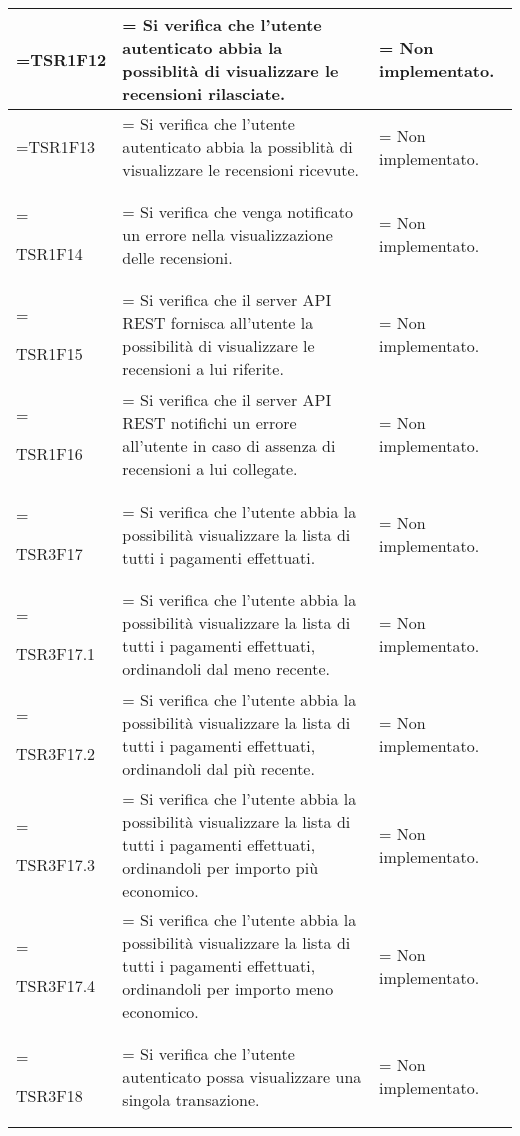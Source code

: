 \begin{xltabular}{\textwidth} {
        >{\hsize\linewidth=\hsize}X
        >{\hsize\linewidth=\hsize}X
        >{\hsize\linewidth=\hsize}X
    }
    TSR1F12 &
    Si verifica che l'utente autenticato abbia la possiblità di visualizzare le recensioni rilasciate.  &
    Non implementato.
    \\ \hline

    TSR1F13 &
    Si verifica che l'utente autenticato abbia la possiblità di visualizzare le recensioni ricevute.  &
    Non implementato.
    \\ \hline

    TSR1F14 &
    Si verifica che venga notificato un errore nella visualizzazione delle recensioni.  &
    Non implementato.
    \\ \hline

    TSR1F15 &
    Si verifica che il server API REST fornisca all'utente la possibilità di visualizzare le recensioni a lui riferite. &
    Non implementato.
    \\ \hline

    TSR1F16 &
    Si verifica che il server API REST notifichi un errore all'utente in caso di assenza di recensioni a lui collegate. &
    Non implementato.
    \\ \hline


    TSR3F17 &
    Si verifica che l'utente abbia la possibilità visualizzare la lista di tutti i pagamenti
    effettuati. &
    Non implementato.
    \\ \hline

    TSR3F17.1 &
    Si verifica che l'utente abbia la possibilità visualizzare la lista di tutti i pagamenti
    effettuati, ordinandoli dal meno recente. &
    Non implementato.
    \\ \hline

    TSR3F17.2 &
    Si verifica che l'utente abbia la possibilità visualizzare la lista di tutti i pagamenti
    effettuati, ordinandoli dal più recente. &
    Non implementato.
    \\ \hline

    TSR3F17.3 &
    Si verifica che l'utente abbia la possibilità visualizzare la lista di tutti i pagamenti
    effettuati, ordinandoli per importo più economico. &
    Non implementato.
    \\ \hline
    
    TSR3F17.4 &
    Si verifica che l'utente abbia la possibilità visualizzare la lista di tutti i pagamenti
    effettuati, ordinandoli per importo meno economico. &
    Non implementato.
    \\ \hline

    TSR3F18 &
    Si verifica che l'utente autenticato possa visualizzare una singola transazione. &
    Non implementato.
    \\ \hline


\end{xltabular}
